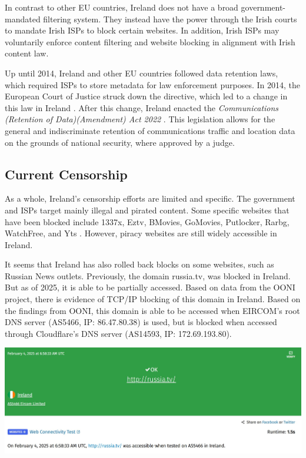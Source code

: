 In contrast to other EU countries, Ireland does not have a broad government-mandated filtering system. They instead have the power through the Irish courts to mandate Irish ISPs to block certain websites. In addition, Irish ISPs may voluntarily enforce content filtering and website blocking in alignment with Irish content law.

Up until 2014, Ireland and other EU countries followed data retention laws, which required ISPs to store metadata for law enforcement purposes. In 2014, the European Court of Justice struck down the directive, which led to a change in this law in Ireland \cite{DataRetentionInvalid2014}. After this change, Ireland enacted the \textit{Communications (Retention of Data)(Amendment) Act 2022} \cite{irishlegalDataRetention}. This legislation allows for the general and indiscriminate retention of communications traffic and location data on the grounds of national security, where approved by a judge.

\subsection{Current Censorship}

As a whole, Ireland's censorship efforts are limited and specific. The government and ISPs target mainly illegal and pirated content. Some specific websites that have been blocked include 1337x, Eztv, BMovies, GoMovies, Putlocker, Rarbg, WatchFree, and Yts \cite{siliconrepublicMovieIndustry}. However, piracy websites are still widely accessible in Ireland.

It seems that Ireland has also rolled back blocks on some websites, such as Russian News outlets. Previously, the domain russia.tv, was blocked in Ireland. But as of 2025, it is able to be partially accessed. Based on data from the OONI project, there is evidence of TCP/IP blocking of this domain in Ireland. Based on the findings from OONI, this domain is able to be accessed when EIRCOM's root DNS server (AS5466, IP: 86.47.80.38) is used, but is blocked when accessed through Cloudflare's DNS server (AS14593, IP: 172.69.193.80).

\centerline{\includegraphics[width=480pt]{Griff/Latex/TCD SCSS CAPSTONE/Literature Review/Eircom Access russiatb.jpg}}

